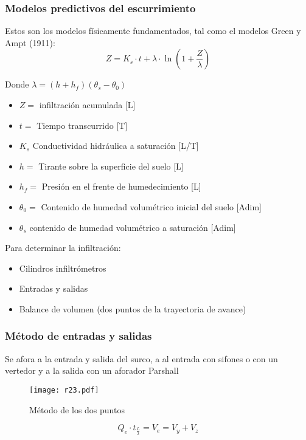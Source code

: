\subsubsection{Modelos predictivos del escurrimiento}
Estos son los modelos físicamente fundamentados, tal como el modelos Green y Ampt (1911):
\begin{equation}
    Z= K_s \cdot t +\lambda \cdot \ln{\left(1 + \frac{Z}{\lambda} \right)}
\end{equation}
\begin{notation}
    Donde $\lambda= \left(h+h_f\right)\left(\theta_s-\theta_0\right)$
    \begin{itemize}
        \item $Z=$ infiltración acumulada [L]
        \item $t=$ Tiempo transcurrido [T]
        \item $K_s$ Conductividad hidráulica a saturación [L/T]
        \item $h=$ Tirante sobre la superficie del suelo [L]
        \item $h_f=$ Presión en el frente de humedecimiento [L]
        \item $\theta_0=$ Contenido de humedad volumétrico inicial del suelo [Adim]
        \item $\theta_s$ contenido de humedad volumétrico a saturación [Adim]
    \end{itemize}
\end{notation}
Para determinar la infiltración:
\begin{itemize}
    \item Cilindros infiltrómetros
    \item Entradas y salidas
    \item Balance de volumen (dos puntos de la trayectoria de avance)
\end{itemize}
\subsubsection{Método de entradas y salidas}
Se afora a la entrada y salida del surco, a al entrada con sifones o con un vertedor y a la salida con un aforador Parshall
\begin{figure}[h!]
\centering
  \texttt{[image: r23.pdf]}
  \caption{Método de los dos puntos}
  \label{r23}
\end{figure}
\begin{equation}
    Q_e \cdot t_{\frac{L}{2}} = V_e = V_y + V_z
\end{equation}

